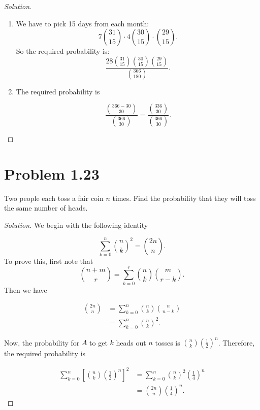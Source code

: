 \documentclass[12pt,letterpaper,reqno]{amsart}
\numberwithin{equation}{subsection}
\begin{document}
\begin{proof}[Solution]~\\

\begin{enumerate}[label=(\alph*),leftmargin=*]
    \item We have to pick 15 days from each month:
    \[ 7 \binom{31}{15} \cdot 4 \binom{30}{15} \cdot \binom{29}{15}. \]
    So the required probability is:
    \[ \frac{28 \binom{31}{15}\binom{30}{15}\binom{29}{15}}{\binom{366}{180}}. \]
    
    \item The required probability is
    
    \[ \frac{\binom{366-30}{30}}{\binom{366}{30}} = \frac{\binom{336}{30}}{\binom{366}{30}}. \]
\end{enumerate}
\end{proof}

\newpage
\section{Problem 1.23}

Two people each toss a fair coin $n$ times. Find the probability that they will toss the same number of heads.

\begin{proof}[Solution]

We begin with the following identity

\begin{equation}
    \sum_{k=0}^n \binom{n}{k}^2 = \binom{2n}{n}.
\end{equation}
To prove this, first note that
\[ \binom{n+m}{r} = \sum_{k=0}^{r} \binom{n}{k} \binom{m}{r-k}. \]
Then we have

\begin{align*}
    \binom{2n}{n} &= \sum_{k=0}^n \binom{n}{k} \binom{n}{n-k} \\
                  &= \sum_{k=0}^n \binom{n}{k}^2.
\end{align*}

Now, the probability for $A$ to get $k$ heads out $n$ tosses is $\binom{n}{k} \left(\frac{1}{2} \right)^n$. Therefore, the required probability is

\begin{align*}
    \sum_{k=0}^n \left[ \binom{n}{k} \left(\frac{1}{2} \right)^n \right]^2 &= \sum_{k=0}^n \binom{n}{k}^2 \left(\frac{1}{4} \right)^n \\
    &= \binom{2n}{n} \left( \frac{1}{4} \right)^n.
\end{align*}
\end{proof}
\end{document}
